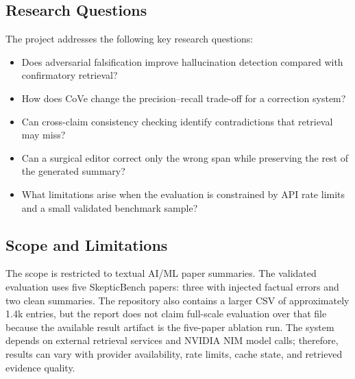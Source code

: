\documentclass[12pt, a4paper]{report}
\begin{document}
\subsection{Research Questions}

The project addresses the following key research questions:

\begin{itemize}
    \item Does adversarial falsification improve hallucination detection compared with confirmatory retrieval?
    \item How does CoVe change the precision--recall trade-off for a correction system?
    \item Can cross-claim consistency checking identify contradictions that retrieval may miss?
    \item Can a surgical editor correct only the wrong span while preserving the rest of the generated summary?
    \item What limitations arise when the evaluation is constrained by API rate limits and a small validated benchmark sample?
\end{itemize}

\subsection{Scope and Limitations}

The scope is restricted to textual AI/ML paper summaries. The validated
evaluation uses five SkepticBench papers: three with injected factual errors and
two clean summaries. The repository also contains a larger CSV of approximately
1.4k entries, but the report does not claim full-scale evaluation over that file
because the available result artifact is the five-paper ablation run. The system
depends on external retrieval services and NVIDIA NIM model calls; therefore,
results can vary with provider availability, rate limits, cache state, and
retrieved evidence quality.
\end{document}
